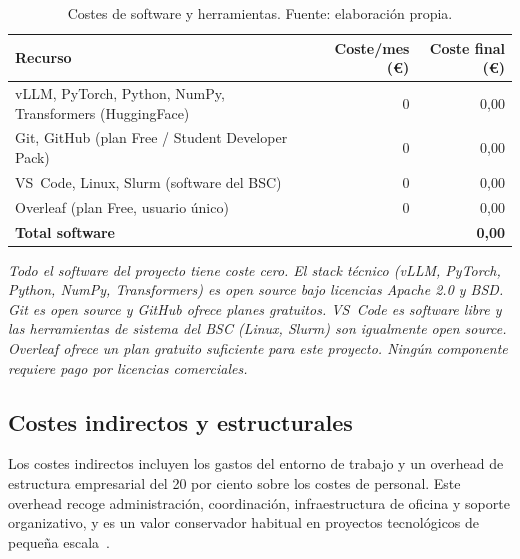 \documentclass[11pt,a4paper]{article}
\begin{document}
\begin{table}[H]
\centering
\caption{Costes de software y herramientas. Fuente: elaboración propia.}
\label{tab:software}
\footnotesize
\begin{tabular}{l r r}
\toprule
\textbf{Recurso} & \textbf{Coste/mes (\euro{})} & \textbf{Coste final (\euro{})} \\
\midrule
vLLM, PyTorch, Python, NumPy, Transformers (HuggingFace) & 0 & 0,00 \\
Git, GitHub (plan Free / Student Developer Pack)         & 0 & 0,00 \\
VS~Code, Linux, Slurm (software del BSC)                 & 0 & 0,00 \\
Overleaf (plan Free, usuario único)                      & 0 & 0,00 \\
\midrule
\textbf{Total software} & & \textbf{0,00} \\
\bottomrule
\end{tabular}
\end{table}

\noindent\textit{\scriptsize Todo el software del proyecto tiene coste cero. El stack técnico (vLLM, PyTorch, Python, NumPy, Transformers) es open source bajo licencias Apache 2.0 y BSD. Git es open source y GitHub ofrece planes gratuitos. VS~Code es software libre y las herramientas de sistema del BSC (Linux, Slurm) son igualmente open source. Overleaf ofrece un plan gratuito suficiente para este proyecto. Ningún componente requiere pago por licencias comerciales.}

\subsection{Costes indirectos y estructurales}

Los costes indirectos incluyen los gastos del entorno de trabajo y un overhead de estructura empresarial del 20 por ciento sobre los costes de personal. Este overhead recoge administración, coordinación, infraestructura de oficina y soporte organizativo, y es un valor conservador habitual en proyectos tecnológicos de pequeña escala~\cite{pmbok}.
\end{document}
